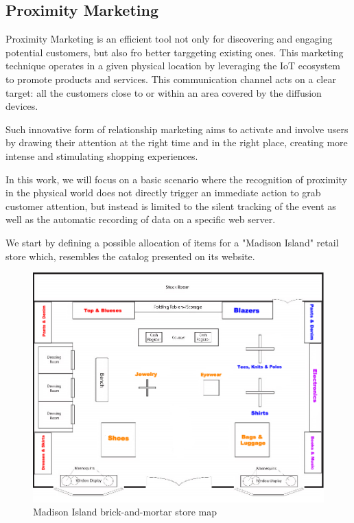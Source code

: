 \subsection{Proximity Marketing}
\label{ssection:proximity-marketing}

Proximity Marketing is an efficient tool not only for discovering and engaging potential customers, but also fro better targgeting existing ones. This marketing technique operates in a given physical location by leveraging the IoT ecosystem to promote products and services.  This communication channel acts on a clear target: all the customers close to or within an area covered by the diffusion devices.

Such innovative form of relationship marketing aims to activate and involve users by drawing their attention at the right time and in the right place, creating more intense and stimulating shopping experiences.

In this work, we will focus on a basic scenario where the recognition of proximity in the physical world does not directly trigger an immediate action to grab customer attention, but instead is limited to the silent tracking of the event as well as the automatic recording of data on a specific web server.

We start by defining a possible allocation of items for a "Madison Island" retail store which, resembles the catalog presented on its website.

\vspace{0.5cm}
\begin{figure}[H]
  \centering
    \includegraphics[width=16cm]{images/madison/retail-map.jpg}
  \caption{Madison Island brick-and-mortar store map}
  \label{fig:retail-map}
\end{figure}
\vspace{0.5cm}

